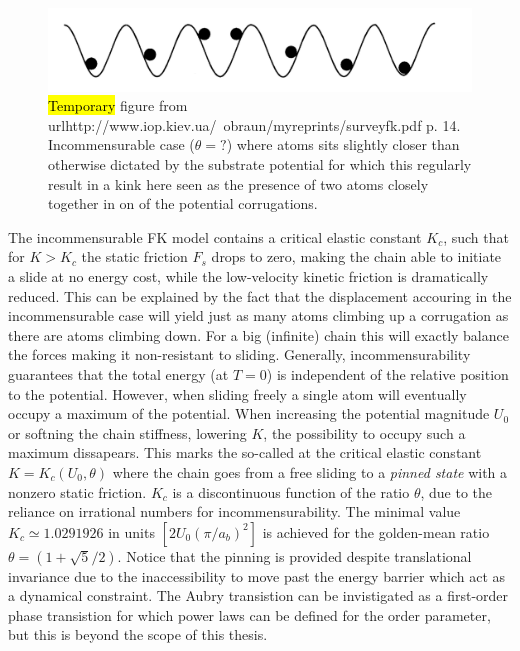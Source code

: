 \begin{figure}[H]
  \centering
  \includegraphics[width=0.5\linewidth]{figures/theory/incommensurable_example.png}
  \caption{\hl{Temporary} figure from
  url{http://www.iop.kiev.ua/~obraun/myreprints/surveyfk.pdf} p. 14.
  Incommensurable case ($\theta = ?$) where atoms sits slightly closer than
  otherwise dictated by the substrate potential for which this regularly result
  in a kink here seen as the presence of two atoms closely together in on of the
  potential corrugations.}
  \label{fig:incommensurable_example}
\end{figure}


The incommensurable \acrshort{FK} model contains a critical elastic constant $K_c$, such
that for $K > K_c$ the static friction $F_s$ drops to zero, making the chain able to initiate a slide at no energy cost, while the low-velocity kinetic friction is dramatically reduced. This can be explained by the
fact that the displacement accouring in the incommensurable case will yield just
as many atoms climbing up a corrugation as there are atoms climbing down. For a big (infinite) chain this will exactly balance the forces making it
non-resistant to sliding. Generally, incommensurability guarantees that the
total energy (at $T=0$) is independent of the relative position to the
potential. However, when sliding freely a single atom will eventually occupy a
maximum of the potential. When increasing the potential magnitude $U_0$ or
softning the chain stiffness, lowering $K$, the possibility to occupy such a
maximum dissapears. This marks the so-called 
at the critical elastic constant $K = K_c(U_0, \theta)$ where the chain goes
from a free sliding to a \textit{pinned state} with a nonzero static friction.
$K_c$ is a discontinuous function of the ratio $\theta$, due to the reliance on
irrational numbers for incommensurability. The minimal
value $K_c \simeq 1.0291926 $ in units $[2 U_0 (\pi / a_b)^2]$ is achieved for
the golden-mean ratio $\theta = (1+\sqrt{5}/2)$. Notice that the pinning is
provided despite translational invariance due to the inaccessibility to move
past the energy barrier which act as a dynamical constraint. The Aubry transistion
can be invistigated as a first-order phase transistion for which power laws can be
defined for the order parameter, but this is beyond the scope of this thesis.

